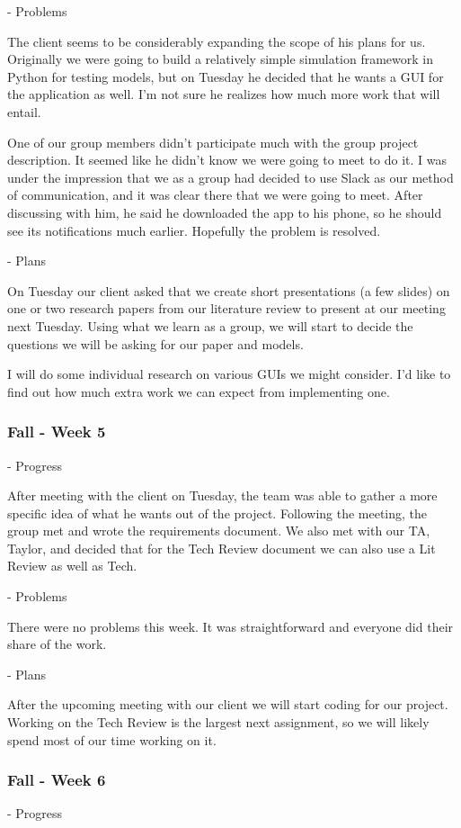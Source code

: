 \documentclass[onecolumn, draftclsnofoot,10pt, compsoc]{IEEEtran}
\begin{document}
- Problems

The client seems to be considerably expanding the scope of his plans for us.
Originally we were going to build a relatively simple simulation framework in Python for testing models, but on Tuesday he decided that he wants a GUI for the application as well.
I'm not sure he realizes how much more work that will entail.

One of our group members didn't participate much with the group project description.
It seemed like he didn't know we were going to meet to do it.
I was under the impression that we as a group had decided to use Slack as our method of communication, and it was clear there that we were going to meet.
After discussing with him, he said he downloaded the app to his phone, so he should see its notifications much earlier.
Hopefully the problem is resolved.

- Plans

On Tuesday our client asked that we create short presentations (a few slides) on one or two research papers from our literature review to present at our meeting next Tuesday.
Using what we learn as a group, we will start to decide the questions we will be asking for our paper and models.

I will do some individual research on various GUIs we might consider.
I'd like to find out how much extra work we can expect from implementing one.
\subsubsection{Fall - Week 5}
- Progress

After meeting with the client on Tuesday, the team was able to gather a more specific idea of what he wants out of the project.
Following the meeting, the group met and wrote the requirements document.
We also met with our TA, Taylor, and decided that for the Tech Review document we can also use a Lit Review as well as Tech.

- Problems

There were no problems this week.
It was straightforward and everyone did their share of the work.

- Plans

After the upcoming meeting with our client we will start coding for our project.
Working on the Tech Review is the largest next assignment, so we will likely spend most of our time working on it.
\subsubsection{Fall - Week 6}
- Progress
\end{document}
